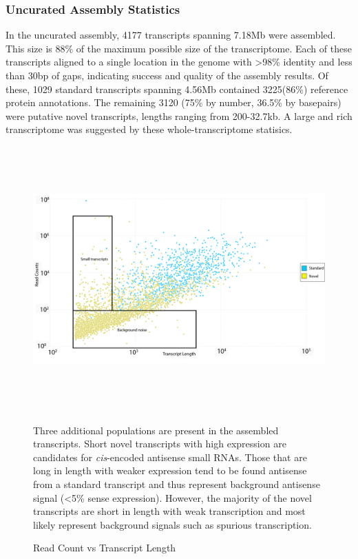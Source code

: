 \subsubsection{Uncurated Assembly Statistics}

In the uncurated assembly, 4177 transcripts spanning 7.18Mb were assembled. This size is 88\% of the maximum possible size of the transcriptome. Each of these transcripts aligned to a single location in the genome with \textgreater 98\% identity and less than 30bp of gaps, indicating success and quality of the assembly results. Of these, 1029 standard transcripts spanning 4.56Mb contained 3225(86\%) reference protein annotations. The remaining 3120 (75\% by number, 36.5\% by basepairs) were putative novel transcripts, lengths ranging from 200-32.7kb. A large and rich transcriptome was suggested by these whole-transcriptome statisics.

\begin{figure}[h!]
\small
\begin{center}
\includegraphics[width=\textwidth,height=4in]{images/Assembly/Summary/Depth_vs_length.png}
\end{center}
\caption{Read Count vs Transcript Length}\label{fig:5.3}
Three additional populations are present in the assembled transcripts. Short novel transcripts with high expression are candidates for \textit{cis}-encoded antisense small RNAs. Those that are long in length with weaker expression tend to be found antisense from a standard transcript and thus represent background antisense signal (\textless 5\% sense expression). However, the majority of the novel transcripts are short in length with weak transcription and most likely represent background signals such as spurious transcription.
\end{figure}

